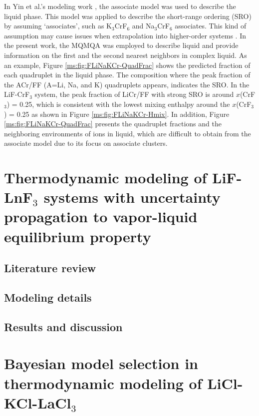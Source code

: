 In Yin et al.’s modeling work \cite{yin2018thermodynamic}, the associate model was used to describe the liquid phase. This model was applied to describe the short-range ordering (SRO) by assuming ‘associates’, such as K$_3$CrF$_6$ and Na$_3$CrF$_6$ associates. This kind of assumption may cause issues when extrapolation into higher-order systems \cite{pelton2018phase}. In the present work, the MQMQA was employed to describe liquid and provide information on the first and the second nearest neighbors in complex liquid. As an example, Figure \ref{ms:fig:FLiNaKCr-QuadFrac} shows the predicted fraction of each quadruplet in the liquid phase. The composition where the peak fraction of the ACr/FF (A=Li, Na, and K) quadruplets appears, indicates the SRO. In the LiF-CrF$_3$ system, the peak fraction of LiCr/FF with strong SRO is around $x$(CrF$_3$) = 0.25, which is consistent with the lowest mixing enthalpy around the $x$(CrF$_3$) = 0.25 as shown in Figure \ref{ms:fig:FLiNaKCr-Hmix}. In addition, Figure \ref{ms:fig:FLiNaKCr-QuadFrac} presents the quadruplet fractions and the neighboring environments of ions in liquid, which are difficult to obtain from the associate model due to its focus on associate clusters.

\section{Thermodynamic modeling of LiF-LnF${_3}$ systems with uncertainty propagation to vapor-liquid equilibrium property} \label{moltensalts:sec:LiFLnF3}

\subsection{Literature review} \label{moltensalts:ssec:LiFLnF3lit}


\subsection{Modeling details} \label{moltensalts:ssec:LiFLnF3model}


\subsection{Results and discussion} \label{moltensalts:ssec:LiFLnF3result}


\section{Bayesian model selection in thermodynamic modeling of LiCl-KCl-LaCl${_3}$} \label{moltensalts:sec:LaCl3}

